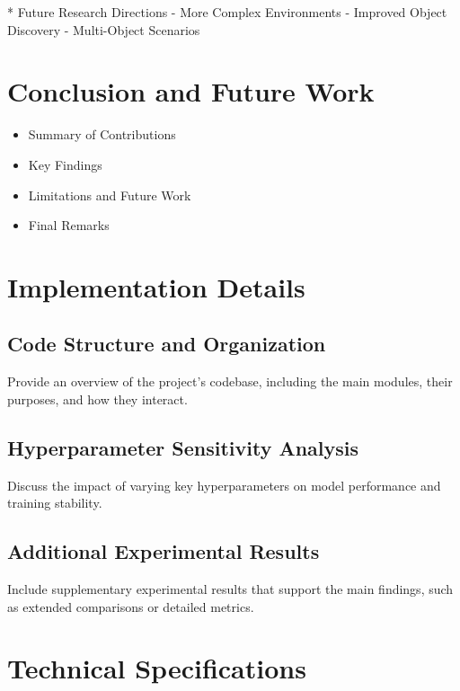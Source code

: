 \documentclass[
	english,
	ruledheaders=section,
	class=report,
	thesis={type=master},
	accentcolor=9c,
	custommargins=true,
	marginpar=false,
	parskip=half-,
	fontsize=11pt,
]{tudapub}
\begin{document}
* Future Research Directions
- More Complex Environments
- Improved Object Discovery
- Multi-Object Scenarios

\chapter{Conclusion and Future Work}
\label{chap:conclusion}

\begin{itemize}
	\item Summary of Contributions
	\item Key Findings
	\item Limitations and Future Work
	\item Final Remarks
\end{itemize}

\printbibliography[title={References}]

\appendix

\chapter{Implementation Details}
\label{app:implementation}

\section{Code Structure and Organization}
\label{app:code_structure}
Provide an overview of the project's codebase, including the main modules, their purposes, and how they interact.

\section{Hyperparameter Sensitivity Analysis}
\label{app:hyperparameter_analysis}
Discuss the impact of varying key hyperparameters on model performance and training stability.

\section{Additional Experimental Results}
\label{app:additional_results}
Include supplementary experimental results that support the main findings, such as extended comparisons or detailed metrics.

\chapter{Technical Specifications}
\label{app:technical_specs}
\end{document}
